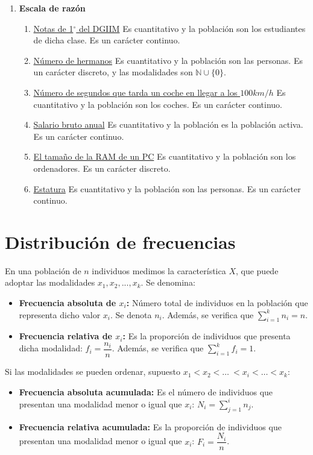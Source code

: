 \begin{ejercicio*}
\begin{enumerate}
    \item \textbf{Escala de razón}
    \begin{enumerate}
        \item \underline{Notas de 1$^\circ$ del DGIIM} Es cuantitativo y la población son los estudiantes de dicha clase. Es un carácter continuo.
        \item \underline{Número de hermanos} Es cuantitativo y la población son las personas. Es un carácter discreto, y las modalidades son $\mathbb{N} \cup \{0\}$.
        \item \underline{Número de segundos que tarda un coche en llegar a los $100 km/h$} Es cuantitativo y la población son los coches. Es un carácter continuo.
        \item \underline{Salario bruto anual} Es cuantitativo y la población es la población activa. Es un carácter continuo.
        \item \underline{El tamaño de la RAM de un PC} Es cuantitativo y la población son los ordenadores. Es un carácter discreto.
        \item \underline{Estatura} Es cuantitativo y la población son las personas. Es un carácter continuo.
    \end{enumerate}
\end{enumerate}

\end{ejercicio*}

\section{Distribución de frecuencias}

En una población de $n$ individuos medimos la característica $X$, que puede adoptar las modalidades $x_{1}, x_{2}, ..., x_{k}$. Se denomina:
\begin{itemize}
    \item \textbf{Frecuencia absoluta de $x_{i}$:} Número total de individuos en la población que representa dicho valor $x_{i}$. Se denota $n_{i}$. Además, se verifica que $\sum\limits_{i = 1}^{k} n_{i} = n$.

    \item \textbf{Frecuencia relativa de $x_{i}$:} Es la proporción de individuos que presenta dicha modalidad: $f_{i} = \dfrac{n_{i}}{n}$. Además, se verifica que $\sum\limits_{i = 1}^{k} f_{i} = 1$.
\end{itemize}

Si las modalidades se pueden ordenar, supuesto $x_{1} < x_{2} < \ldots~< x_{i} < \ldots < x_{k}$:
\begin{itemize}
    \item \textbf{Frecuencia absoluta acumulada:} Es el número de individuos que presentan una modalidad menor o igual que $x_{i}$: $N_{i} = \sum\limits_{j=1}^{i}n_{j}$.
    \item \textbf{Frecuencia relativa acumulada:} Es la proporción de individuos que presentan una modalidad menor o igual que $x_{i}$: $F_{i} = \dfrac{N_{i}}{n}$.
\end{itemize}


